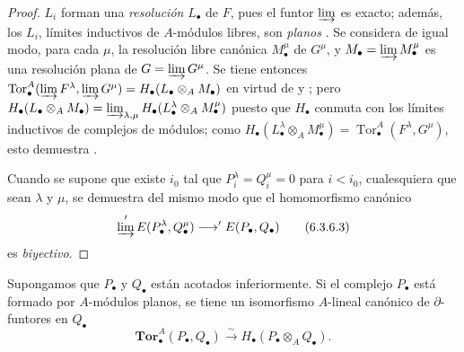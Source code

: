 \begin{proof}
$L_i$ forman una \emph{resolución} $L_\bullet$ de $F$, pues el funtor
$\varinjlim$ es exacto; además, los $L_i$, límites inductivos de
$A$-módulos libres, son \emph{planos} . Se considera de
igual modo, para cada $\mu$, la resolución libre canónica $M_\bullet^\mu$ de
$G^\mu$, y $M_\bullet=\varinjlim M_\bullet^\mu$ es una resolución plana
de $G=\varinjlim G^\mu$. Se tiene entonces
$\operatorname{Tor}_\bullet^A(\varinjlim F^\lambda,
\varinjlim G^\mu)=H_\bullet(L_\bullet\otimes_A M_\bullet)$ en virtud de
 y ; pero
$H_\bullet(L_\bullet\otimes_A M_\bullet)
=\varinjlim_{\lambda,\mu}
H_\bullet(L_\bullet^\lambda\otimes_A M_\bullet^\mu)$
puesto que $H_\bullet$ conmuta con los límites inductivos de complejos de
módulos; como $H_\bullet(L_\bullet^\lambda\otimes_A M_\bullet^\mu)
=\operatorname{Tor}_\bullet^A(F^\lambda,G^\mu)$, esto demuestra
.

Cuando se supone que existe $i_0$ tal que
$P_i^\lambda=Q_i^\mu=0$ para $i<i_0$, cualesquiera que sean $\lambda$ y
$\mu$, se demuestra del mismo modo que el homomorfismo canónico
\[
  \varinjlim'E(P_\bullet^\lambda,Q_\bullet^\mu)
  \longrightarrow'E(P_\bullet,Q_\bullet)
  \tag{6.3.6.3}\label{III.6.3.6.3.fr}
\]
es \emph{biyectivo}.
\end{proof}

\begin{proposition}[6.3.7]
\label{III.6.3.7}
Supongamos que $P_\bullet$ y $Q_\bullet$ están acotados inferiormente. Si el
complejo $P_\bullet$ está formado por $A$-módulos planos, se tiene un
isomorfismo $A$-lineal canónico de $\partial$-funtores en $Q_\bullet$
\[
  \mathbf{Tor}_\bullet^A(P_\bullet,Q_\bullet)
  \xrightarrow{\sim}H_\bullet(P_\bullet\otimes_A Q_\bullet).
  \tag{6.3.7.1}\label{III.6.3.7.1.fr}
\]
\end{proposition}

